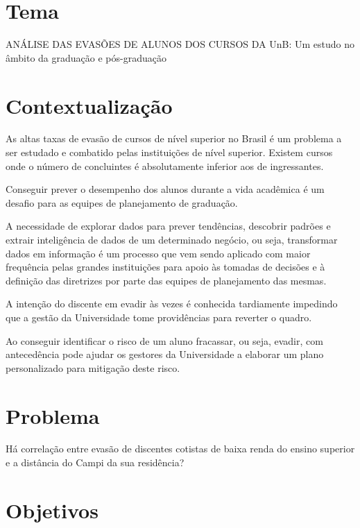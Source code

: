 \section{Tema}%
ANÁLISE DAS EVASÕES DE ALUNOS DOS CURSOS DA UnB: Um estudo no âmbito da graduação e pós-graduação

\section{Contextualização}%

As altas taxas de evasão de cursos de nível superior no Brasil é um problema a ser estudado e combatido pelas instituições de nível superior. Existem cursos onde o  número de concluintes é absolutamente inferior aos de ingressantes. 

Conseguir prever o desempenho dos alunos durante a vida acadêmica é um desafio para as equipes de planejamento de graduação. 

A necessidade de explorar dados para prever tendências, descobrir padrões e extrair inteligência de dados de um determinado negócio, ou seja, transformar dados em informação é um processo que vem sendo aplicado com  maior frequência pelas grandes instituições para apoio às tomadas de decisões e à definição das diretrizes por parte das equipes de planejamento das mesmas.

A intenção do discente em evadir às vezes é conhecida tardiamente impedindo que a gestão da Universidade tome providências para reverter o quadro.

Ao conseguir identificar o risco de um aluno fracassar, ou seja, evadir, com antecedência pode ajudar os gestores da Universidade a elaborar um plano personalizado para mitigação deste risco.

\section{Problema}%

Há correlação entre evasão de discentes cotistas de baixa renda do ensino superior e a distância do Campi da sua residência?
\section{Objetivos}%

